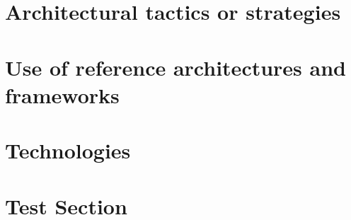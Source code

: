 \documentclass[11pt,a4paper,titlepage]{article}
\begin{document}
\section{Architectural tactics or strategies}

	

\section{Use of reference architectures and frameworks}

	
	

\section {Technologies}



\section{Test Section}


\end{document}

